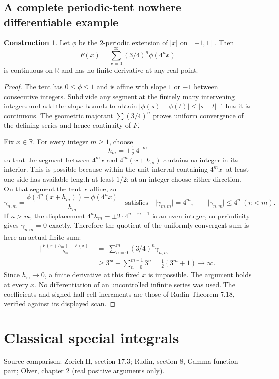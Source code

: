 \documentclass[11pt,oneside,a4paper]{book}
\theoremstyle{definition}
\newtheorem{construction}[theorem]{Construction}
\theoremstyle{remark}
\newcommand{\R}{\mathbb R}
\newcommand{\abs}[1]{\lvert#1\rvert}
\newcommand{\KEntry}[2]{\Needspace{7\baselineskip}\section{#2}\label{#1}{\small\sffamily\color{black!60}\detokenize{#1}}\par}
\newcommand{\SourceRef}[1]{{\small\textsf{Source comparison: #1.}}}
\begin{document}
\KEntry{K03.16.nowhere_differentiable}{A complete periodic-tent nowhere differentiable example}
\begin{construction}
Let $\phi$ be the $2$-periodic extension of $\abs x$ on $[-1,1]$. Then
\[F(x)=\sum_{n=0}^\infty(3/4)^n\phi(4^nx)\]
is continuous on $\R$ and has no finite derivative at any real point.
\end{construction}
\begin{proof}
The tent has $0\leq\phi\leq1$ and is affine with slope $1$ or $-1$ between consecutive integers. Subdivide any segment at the finitely many intervening integers and add the slope bounds to obtain $\abs{\phi(s)-\phi(t)}\leq\abs{s-t}$. Thus it is continuous. The geometric majorant $\sum(3/4)^n$ proves uniform convergence of the defining series and hence continuity of $F$.

Fix $x\in\R$. For every integer $m\geq1$, choose
\[h_m=\pm\tfrac12\,4^{-m}\]
so that the segment between $4^mx$ and $4^m(x+h_m)$ contains no integer in its interior. This is possible because within the unit interval containing $4^mx$, at least one side has available length at least $1/2$; at an integer choose either direction. On that segment the tent is affine, so
\[\gamma_{n,m}=\frac{\phi(4^n(x+h_m))-\phi(4^nx)}{h_m}\quad\text{satisfies}\quad
\abs{\gamma_{m,m}}=4^m,\qquad\abs{\gamma_{n,m}}\leq4^n\ (n<m).\]
If $n>m$, the displacement $4^nh_m=\pm2\cdot4^{n-m-1}$ is an even integer, so periodicity gives $\gamma_{n,m}=0$ exactly. Therefore the quotient of the uniformly convergent sum is here an actual finite sum:
\[\begin{split}
\abs{\frac{F(x+h_m)-F(x)}{h_m}}
&=\abs{\sum_{n=0}^m(3/4)^n\gamma_{n,m}}\\
&\geq3^m-\sum_{n=0}^{m-1}3^n=\tfrac12(3^m+1)\longrightarrow\infty.
\end{split}\]
Since $h_m\to0$, a finite derivative at this fixed $x$ is impossible. The argument holds at every $x$. No differentiation of an uncontrolled infinite series was used. The coefficients and signed half-cell increments are those of Rudin Theorem 7.18, verified against its displayed scan.
\end{proof}

\chapter{Classical special integrals}
\label{module:M03.18}
\SourceRef{Zorich II, section 17.3; Rudin, section 8, Gamma-function part;
Olver, chapter 2 (real positive arguments only)}
\end{document}
